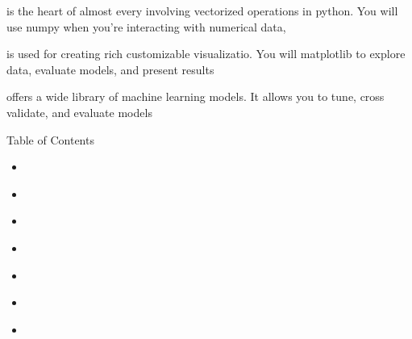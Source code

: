 \documentclass[letterpaper,10pt,english]{jupyterBook}
\begin{document}
\begin{DUlineblock}{0em}
\item[] 
\end{DUlineblock}

\sphinxAtStartPar
{} is the heart of almost every involving vectorized operations in python. You will use numpy when you’re interacting with numerical data,

\begin{DUlineblock}{0em}
\item[] 
\end{DUlineblock}

\sphinxAtStartPar
{} is used for creating rich customizable visualizatio. You will matplotlib to explore data, evaluate models, and present results

\begin{DUlineblock}{0em}
\item[] 
\end{DUlineblock}

\sphinxAtStartPar
{} offers a wide library of machine learning models. It allows you to tune, cross validate, and evaluate models

\sphinxAtStartPar
Table of Contents
\begin{itemize}
\item {} 
\sphinxAtStartPar
{\hyperref[\detokenize{installing-python::doc}]{}}

\item {} 
\sphinxAtStartPar
{\hyperref[\detokenize{jupyter-notebooks::doc}]{}}

\item {} 
\sphinxAtStartPar
{\hyperref[\detokenize{expressions::doc}]{}}

\item {} 
\sphinxAtStartPar
{\hyperref[\detokenize{datatypes::doc}]{}}

\item {} 
\sphinxAtStartPar
{\hyperref[\detokenize{first-program::doc}]{}}

\item {} 
\sphinxAtStartPar
{\hyperref[\detokenize{conditionals::doc}]{}}

\item {} 
\sphinxAtStartPar
{\hyperref[\detokenize{loops::doc}]{}}

\end{itemize}
\end{document}

